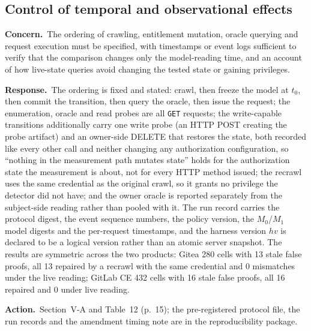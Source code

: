 \documentclass[10pt,letterpaper]{article}
\newcommand{\Concern}[1]{\par\smallskip\noindent\textbf{Concern.}\ #1\par}
\newcommand{\Response}[1]{\par\smallskip\noindent\textbf{Response.}\ #1\par}
\newcommand{\Action}[1]{\par\smallskip\noindent\textbf{Action.}\ #1\par}
\begin{document}
\subsection{Control of temporal and observational effects}
\Concern{The ordering of crawling, entitlement mutation, oracle querying and
request execution must be specified, with timestamps or event logs sufficient to
verify that the comparison changes only the model-reading time, and an account of
how live-state queries avoid changing the tested state or gaining privileges.}
\Response{The ordering is fixed and stated: crawl, then freeze the model at
$t_0$, then commit the transition, then query the oracle, then issue the request;
the enumeration, oracle and read probes are all \texttt{GET} requests; the
write-capable transitions additionally carry one write probe (an HTTP POST
creating the probe artifact) and an owner-side DELETE that restores the state,
both recorded like every other call and neither changing any authorization
configuration, so ``nothing in the measurement path mutates state'' holds for
the authorization state the measurement is about, not for every HTTP method
issued; the recrawl uses the same credential as the original crawl, so it
grants no privilege the detector did not have; and the owner oracle is reported
separately from the subject-side reading rather than pooled with it. The run
record carries the protocol digest, the event sequence numbers, the policy
version, the $M_0$/$M_1$ model digests and the per-request timestamps, and the
harness version $hv$ is declared to be a logical version rather than an atomic
server snapshot. The results are symmetric across the two products: Gitea 280
cells with 13 stale false proofs, all 13 repaired by a recrawl with the same
credential and 0 mismatches under the live reading; GitLab CE 432 cells with 16
stale false proofs, all 16 repaired and 0 under live reading.}
\Action{Section~V-A and Table~12 (p.~15); the pre-registered protocol file, the
run records and the amendment timing note are in the reproducibility package.}
\end{document}
